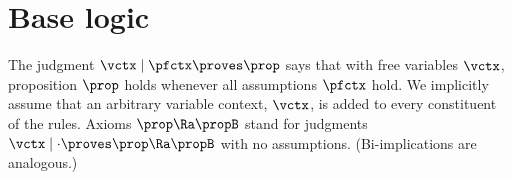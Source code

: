 

\section{Base logic}

The judgment $\vctx \mid \pfctx \proves \prop$ says that with free variables $\vctx$, proposition $\prop$ holds whenever all assumptions $\pfctx$ hold.
We implicitly assume that an arbitrary variable context, $\vctx$, is added to every constituent of the rules.
Axioms $\prop \Ra \propB$ stand for judgments $\vctx \mid \cdot \proves \prop \Ra \propB$ with no assumptions.
(Bi-implications are analogous.)

% 

